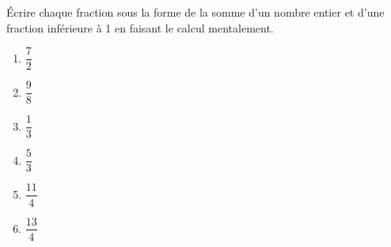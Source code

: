 \begin{exercice*}
   Écrire chaque fraction sous la forme de la somme d'un nombre entier et d'une fraction inférieure à 1 en faisant le calcul mentalement. \medskip
   \begin{multicols}{3}
      \begin{enumerate}
         \item $\dfrac72$ \bigskip
         \item $\dfrac98$ \bigskip
         \item $\dfrac13$ \bigskip
         \item $\dfrac53$ \bigskip
         \item $\dfrac{11}{4}$ \bigskip
         \item $\dfrac{13}{4}$
      \end{enumerate}
   \end{multicols}
\end{exercice*}
